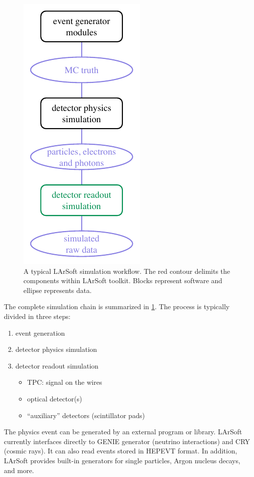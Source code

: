 \begin{figure}
   \centering
   \includegraphics{figures/LArSoftSimulationWorkflow}
   \caption{\label{fig:LArSoftSimulation}
      A typical LArSoft simulation workflow.
      The red contour delimits the components within LArSoft toolkit.
      Blocks represent software and ellipse represents data.
   }
\end{figure}
The complete simulation chain is summarized in \cref{fig:LArSoftSimulation}.
The process is typically divided in three steps:
\begin{enumerate}
   \item event generation
   \item detector physics simulation
   \item detector readout simulation
      \begin{itemize}
         \item TPC: signal on the wires
         \item optical detector(s)
         \item ``auxiliary'' detectors (\eg scintillator pads)
      \end{itemize}
\end{enumerate}

The physics event can be generated by an external program or library.
LArSoft currently interfaces directly to GENIE generator (neutrino interactions)
and CRY (cosmic rays). It can also read events stored in HEPEVT format.
In addition, LArSoft provides built-in generators for single particles,
Argon nucleus decays, and more.

